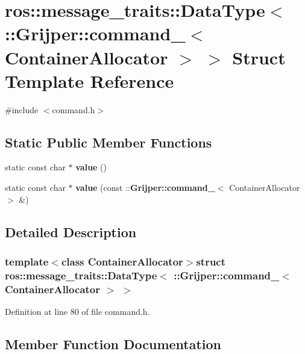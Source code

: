 \section{ros\-:\-:message\-\_\-traits\-:\-:Data\-Type$<$ \-:\-:Grijper\-:\-:command\-\_\-$<$ Container\-Allocator $>$ $>$ Struct Template Reference}
\label{structros_1_1message__traits_1_1DataType_3_01_1_1Grijper_1_1command___3_01ContainerAllocator_01_4_01_4}


{\ttfamily \#include $<$command.\-h$>$}

\subsection*{Static Public Member Functions}
\begin{DoxyCompactItemize}
\item 
static const char $\ast$ {\bf value} ()
\item 
static const char $\ast$ {\bf value} (const \-::{\bf Grijper\-::command\-\_\-}$<$ Container\-Allocator $>$ \&)
\end{DoxyCompactItemize}


\subsection{Detailed Description}
\subsubsection*{template$<$class Container\-Allocator$>$struct ros\-::message\-\_\-traits\-::\-Data\-Type$<$ \-::\-Grijper\-::command\-\_\-$<$ Container\-Allocator $>$ $>$}



Definition at line 80 of file command.\-h.



\subsection{Member Function Documentation}
